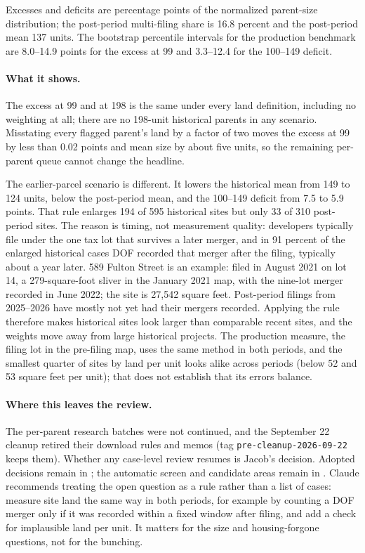 Excesses and deficits are percentage points of the normalized parent-size
distribution; the post-period multi-filing share is 16.8 percent and
the post-period mean 137 units. The bootstrap percentile intervals
for the production benchmark are 8.0--14.9 points for the excess at
99 and 3.3--12.4 for the 100--149 deficit.

\paragraph{What it shows.} The excess at 99 and at 198 is the same under every
land definition, including no weighting at all; there are no 198-unit
historical parents in any scenario. Misstating every flagged parent's land by
a factor of two moves the excess at 99 by less than 0.02 points and
mean size by about five units, so the remaining per-parent queue
cannot change the headline.

The earlier-parcel scenario is different. It lowers the historical mean from
149 to 124 units, below the post-period mean, and the
100--149 deficit from 7.5 to 5.9 points. That rule enlarges
194 of 595 historical sites but only 33 of 310 post-period
sites. The reason is timing, not measurement quality: developers typically
file under the one tax lot that survives a later merger, and in 91
percent of the enlarged historical cases DOF recorded that merger after the
filing, typically about a year later. 589 Fulton Street is an example: filed in
August 2021 on lot 14, a 279-square-foot sliver in the January 2021 map, with
the nine-lot merger recorded in June 2022; the site is 27,542 square feet.
Post-period filings from 2025--2026 have mostly not yet had their mergers
recorded. Applying the rule therefore makes historical sites look larger than
comparable recent sites, and the weights move away from large historical
projects. The production measure, the filing lot in the pre-filing map, uses
the same method in both periods, and the smallest quarter of sites by land per
unit looks alike across periods (below 52 and 53 square feet
per unit); that does not establish that its errors balance.

\paragraph{Where this leaves the review.} The per-parent research batches were
not continued, and the September 22 cleanup retired their download rules and
memos (tag \texttt{pre-cleanup-2026-09-22} keeps them). Whether any case-level
review resumes is Jacob's decision. Adopted decisions remain in
; the automatic screen and candidate areas
remain in . Claude recommends treating the
open question as a rule rather than a list of cases: measure site land the
same way in both periods, for example by counting a DOF merger only if it was
recorded within a fixed window after filing, and add a check for implausible
land per unit. It matters for the size and housing-forgone questions, not for
the bunching.


